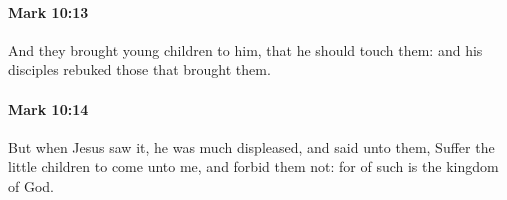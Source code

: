 		\paragraph{Mark 10:13} %
			\label{MARK-10-13}

			And they brought young children to him, that he should touch them: and his disciples rebuked those that brought them.

			\begin{framed}
			\scriptsize
				\begin{compactdesc}
					\item[SBLG] 
				\end{compactdesc}
			\end{framed}

		\paragraph{Mark 10:14} %
			\label{MARK-10-14}

			But when Jesus saw it, he was much displeased, and said unto them, Suffer the little children to come unto me, and forbid them not: for of such is the kingdom of God.

